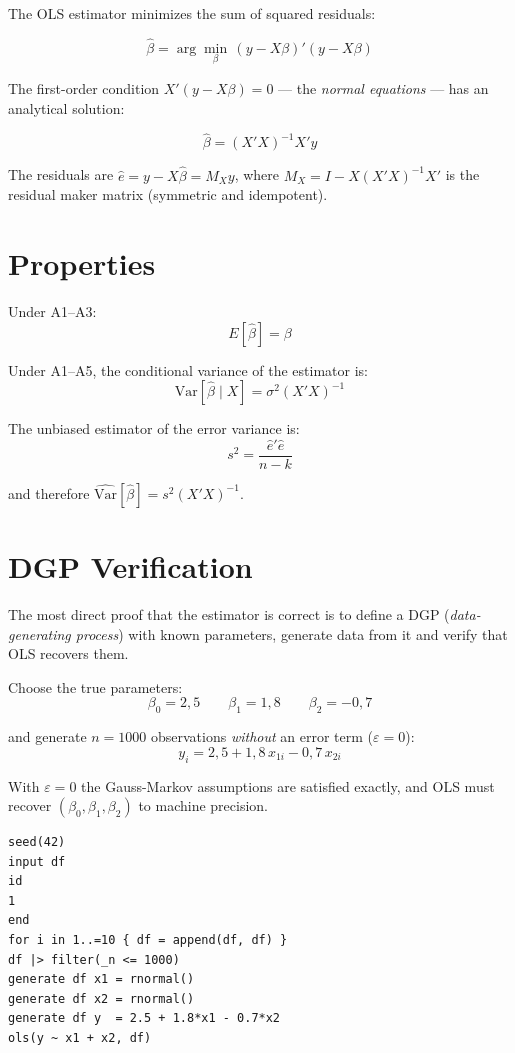 The OLS estimator minimizes the sum of squared residuals:

\[
  \hat{\beta} = \arg\min_{\beta}\, (y - X\beta)'(y - X\beta)
\]

The first-order condition $X'(y - X\beta) = 0$ --- the \emph{normal equations} ---
has an analytical solution:

\[
  \boxed{\hat{\beta} = (X'X)^{-1}X'y}
\]

The residuals are $\hat{e} = y - X\hat{\beta} = M_X y$, where
$M_X = I - X(X'X)^{-1}X'$ is the residual maker matrix (symmetric and idempotent).

\section{Properties}

Under A1--A3:
\[
  E[\hat{\beta}] = \beta
\]

Under A1--A5, the conditional variance of the estimator is:
\[
  \mathrm{Var}[\hat{\beta} \mid X] = \sigma^2 (X'X)^{-1}
\]

The unbiased estimator of the error variance is:
\[
  s^2 = \frac{\hat{e}'\hat{e}}{n - k}
\]

and therefore $\widehat{\mathrm{Var}}[\hat{\beta}] = s^2 (X'X)^{-1}$.

\section{DGP Verification}

The most direct proof that the estimator is correct is to define a DGP
(\emph{data-generating process}) with known parameters, generate data
from it and verify that OLS recovers them.

Choose the true parameters:
\[
  \beta_0 = 2{,}5 \qquad \beta_1 = 1{,}8 \qquad \beta_2 = -0{,}7
\]

and generate $n = 1000$ observations \emph{without} an error term ($\varepsilon = 0$):
\[
  y_i = 2{,}5 + 1{,}8\,x_{1i} - 0{,}7\,x_{2i}
\]

With $\varepsilon = 0$ the Gauss-Markov assumptions are satisfied exactly,
and OLS must recover $(\beta_0, \beta_1, \beta_2)$ to machine precision.

\begin{lstlisting}[caption={Noise-free DGP --- numerical verification}]
seed(42)
input df
id
1
end
for i in 1..=10 { df = append(df, df) }
df |> filter(_n <= 1000)
generate df x1 = rnormal()
generate df x2 = rnormal()
generate df y  = 2.5 + 1.8*x1 - 0.7*x2
ols(y ~ x1 + x2, df)
\end{lstlisting}

